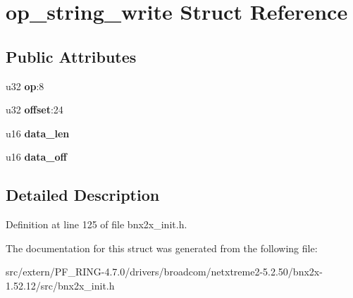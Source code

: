 \hypertarget{structop__string__write}{
\section{op\_\-string\_\-write Struct Reference}
\label{structop__string__write}
}
\subsection*{Public Attributes}
\begin{DoxyCompactItemize}
\item 
\hypertarget{structop__string__write_ac745b687bb8aab1443c37b7c8828019d}{
u32 {\bfseries op}:8}
\label{structop__string__write_ac745b687bb8aab1443c37b7c8828019d}

\item 
\hypertarget{structop__string__write_ad5a5742ee8fa959a855ced52000ba3fb}{
u32 {\bfseries offset}:24}
\label{structop__string__write_ad5a5742ee8fa959a855ced52000ba3fb}

\item 
\hypertarget{structop__string__write_ae6445ae02e5d31e03c1dde7614e63463}{
u16 {\bfseries data\_\-len}}
\label{structop__string__write_ae6445ae02e5d31e03c1dde7614e63463}

\item 
\hypertarget{structop__string__write_aa3a89f05cf86ef184db0ffcb268e23df}{
u16 {\bfseries data\_\-off}}
\label{structop__string__write_aa3a89f05cf86ef184db0ffcb268e23df}

\end{DoxyCompactItemize}


\subsection{Detailed Description}


Definition at line 125 of file bnx2x\_\-init.h.



The documentation for this struct was generated from the following file:\begin{DoxyCompactItemize}
\item 
src/extern/PF\_\-RING-\/4.7.0/drivers/broadcom/netxtreme2-\/5.2.50/bnx2x-\/1.52.12/src/bnx2x\_\-init.h\end{DoxyCompactItemize}
